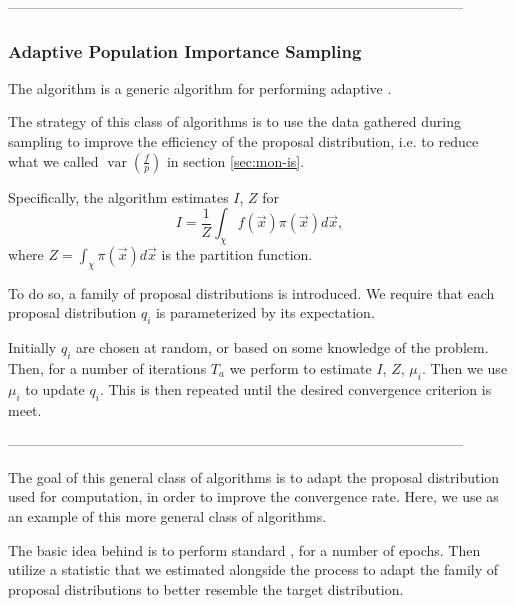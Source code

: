 \documentclass[10pt, a4paper]{article}
\begin{document}
  --------------------------------------------------------------------------------------------------

  \subsubsection{Adaptive Population Importance Sampling}
  The \apis{} algorithm is a generic algorithm for performing adaptive \is{}.

  The strategy of this class of algorithms is to use the data gathered during sampling to improve
  the efficiency of the proposal distribution, i.e. to reduce what we called
  $\operatorname{var}\left(\frac fp\right)$ in section \ref{sec:mon-is}.

  Specifically, the \apis{} algorithm estimates $I$, $Z$ for
  \begin{equation}
  I = \frac{1}{Z} \int_\chi f(\vec{x}) \pi(\vec{x}) d\vec{x},
  \end{equation}
  where $Z = \int_\chi \pi(\vec{x}) d\vec{x}$ is the partition function.

  To do so, a family of proposal distributions is introduced. We require that each proposal distribution
  $q_i$ is parameterized by its expectation\cite{apis}\footnotemark.


  Initially $q_i$ are chosen at random, or based on some knowledge of the problem. Then, for a number
  of iterations $T_a$ we perform \is{} to estimate $I$, $Z$, $\mu_i$. Then we use $\mu_i$ to update
  $q_i$. This is then repeated until the desired convergence criterion is meet.

  --------------------------------------------------------------------------------------------------

  The goal
  of this general class of algorithms is to adapt the proposal distribution used for computation, in
  order to improve the convergence rate. Here, we use \apis{} as an example of this more general class
  of algorithms.

  The basic idea behind \apis{} is to perform standard \is{}, for a number of epochs.
  Then utilize a statistic that we estimated alongside the \is{} process to adapt
  the family of proposal distributions to better resemble the target distribution\cite{apis}.
\end{document}
